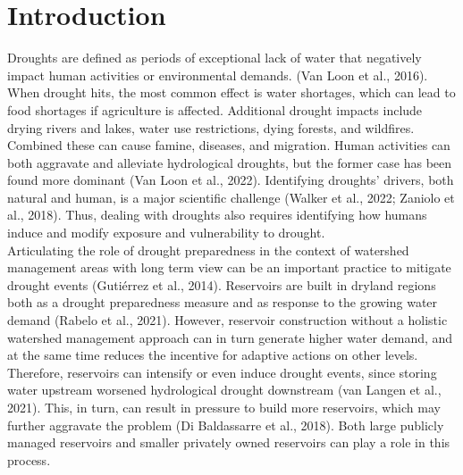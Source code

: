 \documentclass[draft]{agujournal2019}
\begin{document}
\section{Introduction}
Droughts are defined as periods of exceptional lack of water that negatively impact human activities or environmental demands. (Van Loon et al., 2016). When drought hits, the most common effect is water shortages, which can lead to food shortages if agriculture is affected. Additional drought impacts include drying rivers and lakes, water use restrictions, dying forests, and wildfires. Combined these can cause famine, diseases, and migration.  Human activities can both aggravate and alleviate hydrological droughts, but the former case has been found more dominant (Van Loon et al., 2022). Identifying droughts’ drivers, both natural and human, is a major scientific challenge (Walker et al., 2022; Zaniolo et al., 2018). Thus, dealing with droughts also requires identifying how humans induce and modify exposure and vulnerability to drought.\\
Articulating the role of drought preparedness in the context of watershed management areas with long term view can be an important practice to mitigate drought events (Gutiérrez et al., 2014). Reservoirs are built in dryland regions both as a drought preparedness measure and as response to the growing water demand (Rabelo et al., 2021). However, reservoir construction without a holistic watershed management approach can in turn generate higher water demand, and at the same time reduces the incentive for adaptive actions on other levels. Therefore, reservoirs can intensify or even induce drought events, since storing water upstream worsened hydrological drought downstream (van Langen et al., 2021). This, in turn, can result in pressure to build more reservoirs, which may further aggravate the problem (Di Baldassarre et al., 2018). Both large publicly managed reservoirs and smaller privately owned reservoirs can play a role in this process.\\
\end{document}
